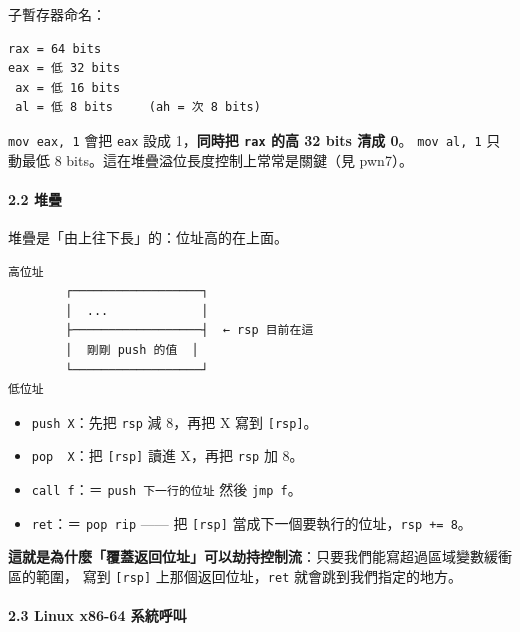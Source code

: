 \documentclass[10pt,a4paper]{article}
\providecommand{\tightlist}{%
  \setlength{\itemsep}{0pt}\setlength{\parskip}{0pt}}
\begin{document}
子暫存器命名：

\begin{Verbatim}[breaklines=true,breakanywhere=true,breakautoindent=false,fontsize=\fontsize{7.0}{9.5}\selectfont]
rax = 64 bits
eax = 低 32 bits
 ax = 低 16 bits
 al = 低 8 bits     (ah = 次 8 bits)
\end{Verbatim}

\texttt{mov\ \allowbreak{}eax,\allowbreak{}\ \allowbreak{}1} 會把 \texttt{eax} 設成 1，\textbf{同時把
\texttt{rax} 的高 32 bits 清成 0}。 \texttt{mov\ \allowbreak{}al,\allowbreak{}\ \allowbreak{}1} 只動最低 8
bits。這在堆疊溢位長度控制上常常是關鍵（見 pwn7）。

\paragraph{2.2 堆疊}\label{ux5806ux758a}

堆疊是「由上往下長」的：位址高的在上面。

\begin{Verbatim}[breaklines=true,breakanywhere=true,breakautoindent=false,fontsize=\fontsize{7.0}{9.5}\selectfont]
高位址
        ┌──────────────────┐
        │  ...             │
        ├──────────────────┤  ← rsp 目前在這
        │  剛剛 push 的值  │
        └──────────────────┘
低位址
\end{Verbatim}

\begin{itemize}
\tightlist
\item
  \texttt{push\ \allowbreak{}X}：先把 \texttt{rsp} 減 8，再把 X 寫到
  \texttt{{[}rsp{]}}。
\item
  \texttt{pop\ \allowbreak{}\ \allowbreak{}X}：把 \texttt{{[}rsp{]}} 讀進 X，再把 \texttt{rsp} 加
  8。
\item
  \texttt{call\ \allowbreak{}f}：＝ \texttt{push\ \allowbreak{}下一行的位址} 然後
  \texttt{jmp\ \allowbreak{}f}。
\item
  \texttt{ret}：＝ \texttt{pop\ \allowbreak{}rip} ------ 把 \texttt{{[}rsp{]}}
  當成下一個要執行的位址，\texttt{rsp\ \allowbreak{}+=\ \allowbreak{}8}。
\end{itemize}

\textbf{這就是為什麼「覆蓋返回位址」可以劫持控制流}：只要我們能寫超過區域變數緩衝區的範圍，
寫到 \texttt{{[}rsp{]}} 上那個返回位址，\texttt{ret}
就會跳到我們指定的地方。

\paragraph{2.3 Linux x86-64
系統呼叫}\label{linux-x86-64-ux7cfbux7d71ux547cux53eb}
\end{document}
